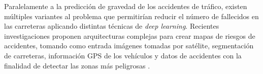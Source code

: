 Paralelamente a la predicción de gravedad de los accidentes de tráfico, existen múltiples variantes al problema que permitirían reducir el número de fallecidos en las carreteras aplicando distintas técnicas de \textit{deep learning}. Recientes investigaciones proponen arquitecturas complejas para crear mapas de riesgos de accidentes, tomando como entrada imágenes tomadas por satélite, segmentación de carreteras, información GPS de los vehículos y datos de accidentes con la finalidad de detectar las zonas más peligrosas
\cite{MIT}.